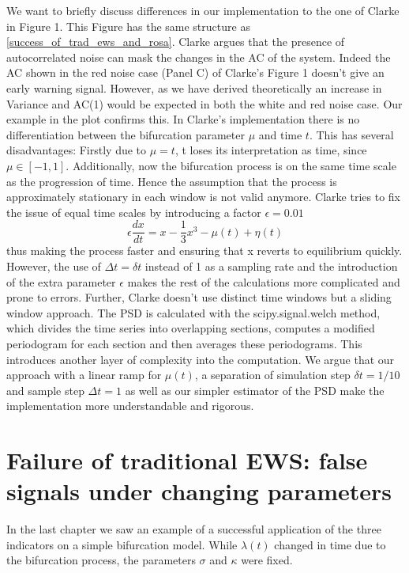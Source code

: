 \documentclass[%
thesis=student,%
coverpage=false,%
titlepage=false,%
headmarks=true, %
english,%
font=libertine, %
math=newpxtx, %
BCOR=5mm,%
coverBCOR=11mm%
]{tumbook}
\begin{document}
We want to briefly discuss differences in our implementation to the one of Clarke in \cite{Clarke:2023} Figure 1. This Figure has the same structure as \ref{success_of_trad_ews_and_rosa}. Clarke argues that the presence of autocorrelated noise can mask the changes in the AC of the system. Indeed the AC shown in the red noise case (Panel C) of Clarke's Figure 1 doesn't give an early warning signal. However, as we have derived theoretically an increase in Variance and AC(1) would be expected in both the white and red noise case. Our example in the plot confirms this. 
In Clarke's implementation there is no differentiation between the bifurcation parameter $\mu$ and time $t$. This has several disadvantages: Firstly due to $\mu = t$, t loses its interpretation as time, since $\mu \in [-1,1]$. Additionally, now the bifurcation process is on the same time scale as the progression of time. Hence the assumption that the process is approximately stationary in each window is not valid anymore. Clarke tries to fix the issue of equal time scales by introducing a factor $\epsilon = 0.01$
\[
\epsilon\frac{dx}{dt} = x - \frac{1}{3}x^3-\mu(t) + \eta(t)
\]
thus making the process faster and ensuring that x reverts to equilibrium quickly. However, the use of $\Delta t = \delta t$ instead of 1 as a sampling rate and the introduction of the extra parameter $\epsilon$ makes the rest of the calculations more complicated and prone to errors. Further, Clarke doesn't use distinct time windows but a sliding window approach. The PSD is calculated with the scipy.signal.welch method, which divides the time series into overlapping sections, computes a modified periodogram for each section and then averages these periodograms. This introduces another layer of complexity into the computation. 
We argue that our approach with a linear ramp for $\mu(t)$, a separation of simulation step $\delta t = 1/10$ and sample step $\Delta t = 1$ as well as our simpler estimator of the PSD make the implementation more understandable and rigorous.



\chapter{Failure of traditional EWS: false signals  under changing parameters}

In the last chapter we saw an example of a successful application of the three indicators on a simple bifurcation model. While $\lambda(t)$ changed in time due to the bifurcation process, the parameters $\sigma$ and $\kappa$ were fixed. 
\end{document}
